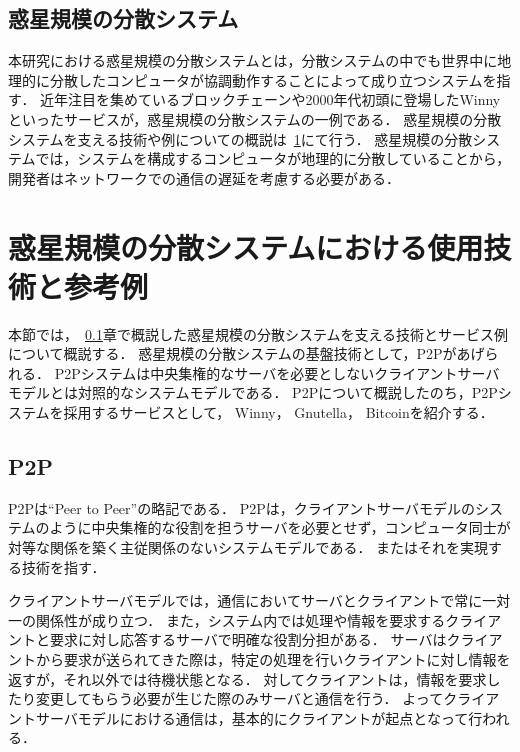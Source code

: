 \subsection{惑星規模の分散システム}
\label{bg:definition:planetary-scale-distributed-system}

本研究における惑星規模の分散システムとは，分散システムの中でも世界中に地理的に分散したコンピュータが協調動作することによって成り立つシステムを指す．
近年注目を集めているブロックチェーンや2000年代初頭に登場したWinnyといったサービスが，惑星規模の分散システムの一例である．
惑星規模の分散システムを支える技術や例についての概説は~\ref{bg:planetary-scale-distributed-system}にて行う．
惑星規模の分散システムでは，システムを構成するコンピュータが地理的に分散していることから，開発者はネットワークでの通信の遅延を考慮する必要がある．

\section{惑星規模の分散システムにおける使用技術と参考例}
\label{bg:planetary-scale-distributed-system}

本節では，~\ref{bg:definition:planetary-scale-distributed-system}章で概説した惑星規模の分散システムを支える技術とサービス例について概説する．
惑星規模の分散システムの基盤技術として，P2Pがあげられる．
P2Pシステムは中央集権的なサーバを必要としないクライアントサーバモデルとは対照的なシステムモデルである．
P2Pについて概説したのち，P2Pシステムを採用するサービスとして， Winny， Gnutella， Bitcoinを紹介する．

\subsection{P2P}
\label{bg:planetary-scale-distributed-system:p2p}

P2Pは``Peer to Peer''の略記である．
P2Pは，クライアントサーバモデルのシステムのように中央集権的な役割を担うサーバを必要とせず，コンピュータ同士が対等な関係を築く主従関係のないシステムモデルである．
またはそれを実現する技術を指す．

クライアントサーバモデルでは，通信においてサーバとクライアントで常に一対一の関係性が成り立つ．
また，システム内では処理や情報を要求するクライアントと要求に対し応答するサーバで明確な役割分担がある．
サーバはクライアントから要求が送られてきた際は，特定の処理を行いクライアントに対し情報を返すが，それ以外では待機状態となる．
対してクライアントは，情報を要求したり変更してもらう必要が生じた際のみサーバと通信を行う．
よってクライアントサーバモデルにおける通信は，基本的にクライアントが起点となって行われる．

